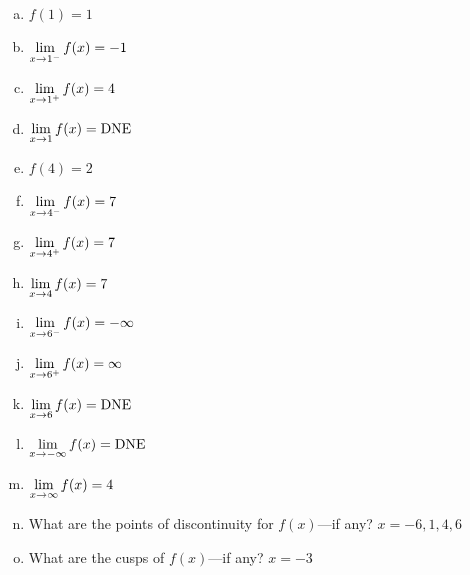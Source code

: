 \documentclass[12pt,letterpaper]{exam}
\begin{document}
\begin{questions}
\begin{enumerate}[(a)]
\item $f(1)= 1$ \vfill
\item $\displaystyle\lim_{x \to 1^-} f(x)= -1$ \vfill
\item $\displaystyle\lim_{x \to 1^+} f(x)= 4$ \vfill
\item $\displaystyle\lim_{x \to 1} f(x)= \text{DNE}$ \vfill
\item $f(4)= 2$ \vfill
\item $\displaystyle\lim_{x \to 4^-} f(x)= 7$ \vfill
\item $\displaystyle\lim_{x \to 4^+} f(x)= 7$ \vfill
\item $\displaystyle\lim_{x \to 4} f(x)= 7$ \vfill
\item $\displaystyle\lim_{x \to 6^-} f(x)= -\infty$ \vfill
\item $\displaystyle\lim_{x \to 6^+} f(x)=\infty$ \vfill
\item $\displaystyle\lim_{x \to 6} f(x)= \text{DNE}$ \vfill
\item $\displaystyle\lim_{x \to -\infty} f(x)= \text{DNE}$ \vfill
\item $\displaystyle\lim_{x \to \infty} f(x)= 4$ \vfill
\item What are the points of discontinuity for $f(x)$---if any? \quad $x= -6, 1, 4, 6$ \vfill
\item What are the cusps of $f(x)$---if any? \quad $x= -3$ \vfill
\end{enumerate}




\end{questions}
\end{document}
